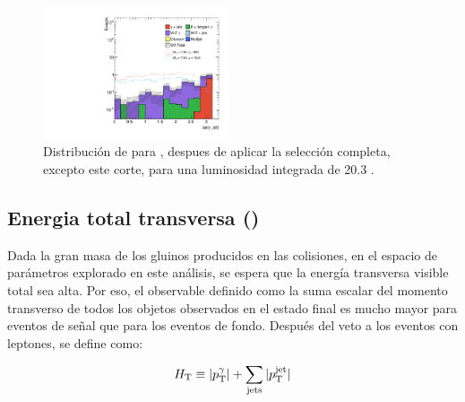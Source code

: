 %



\begin{figure}[!h]
  \centering

  \includegraphics[width=0.49\textwidth]{figures/dphi_gamjet_srh}

  \caption{Distribución de {\dphijg} para {\SRH}, despues de aplicar la selección completa, excepto este corte,
    para una luminosidad integrada de 20.3 \ifb.}
  \label{fig:opt_dphi_gamjet}
\end{figure}



\subsection{Energia total transversa (\HT)}
\label{sec:ht_obj}

Dada la gran masa de los gluinos producidos en las colisiones, en el espacio de
parámetros explorado en este análisis, se espera que la energía transversa
visible total sea alta. Por eso, el observable {\HT} definido como la suma
escalar del momento transverso de todos los objetos observados en el estado
final es mucho mayor para eventos de señal que para los eventos de fondo.
Después del veto a los eventos con leptones, {\HT} se define como:

\begin{equation}
  H_{\mathrm{T}} \equiv |p_{\mathrm{T}}^{\gamma}| + \sum_{\mathrm{jets}} |p_{\mathrm{T}}^\mathrm{jet}|
  \label{eq:ht_def}
\end{equation}

